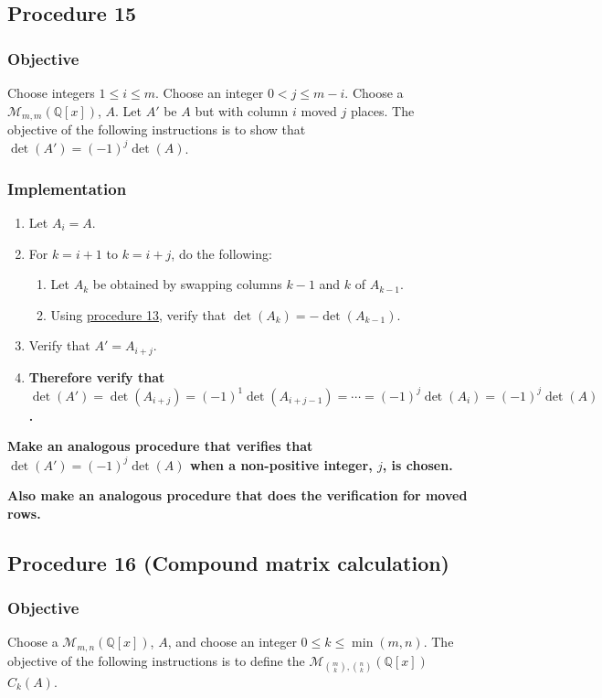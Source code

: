 \documentclass[twocolumn]{article}
\begin{document}
		\subsection{Procedure 15}\label{sec:procedure 15}
			\subsubsection{Objective}
				Choose integers $1\le i\le m$. Choose an integer $0<j\le m-i$. Choose a $\mathcal{M}_{m,m}(\mathbb{Q}[x])$, $A$. Let $A'$ be $A$ but with column $i$ moved $j$ places. The objective of the following instructions is to show that $\det(A')=(-1)^j\det(A)$.
			\subsubsection{Implementation}
				\begin{enumerate}
					\item Let $A_i=A$.
					\item For $k=i+1$ to $k=i+j$, do the following:
					\begin{enumerate}
						\item Let $A_k$ be obtained by swapping columns $k-1$ and $k$ of $A_{k-1}$.
						\item Using \hyperref[sec:procedure 13]{procedure 13}, verify that $\det(A_k)=-\det(A_{k-1})$.
					\end{enumerate}
					\item Verify that $A'=A_{i+j}$.
					\item \textbf{Therefore verify that $\det(A')=\det(A_{i+j})=(-1)^1\det(A_{i+j-1})=\cdots=(-1)^j\det(A_{i})=(-1)^j\det(A)$.}
				\end{enumerate}
			\textbf{Make an analogous procedure that verifies that $\det(A')=(-1)^j\det(A)$ when a non-positive integer, $j$, is chosen.}
			
			\textbf{Also make an analogous procedure that does the verification for moved rows.}
		\subsection{Procedure 16 (Compound matrix calculation)}\label{sec:procedure 16}
			\subsubsection{Objective}
				Choose a $\mathcal{M}_{m,n}(\mathbb{Q}[x])$, $A$, and choose an integer $0\le k\le\min(m,n)$. The objective of the following instructions is to define the $\mathcal{M}_{\binom{m}{k},\binom{n}{k}}(\mathbb{Q}[x])$ $C_k(A)$.
\end{document}
